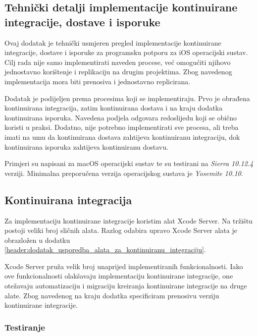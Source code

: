 \documentclass[times, utf8, diplomski, numeric]{fer}
\begin{document}
\begin{appendices}



\chapter{Tehnički detalji implementacije kontinuirane integracije, dostave i isporuke}

Ovaj dodatak je tehnički usmjeren pregled implementacije kontinuirane integracije, dostave i isporuke za programsku potporu za iOS operacijski sustav. Cilj rada nije samo implementirati naveden procese, već omogućiti njihovo jednostavno korištenje i replikaciju na drugim projektima. Zbog navedenog implementacija mora biti prenosiva i jednostavno replicirana.

Dodatak je podijeljen prema procesima koji se implementiraju. Prvo je obrađena kontinuirana integracija, zatim kontinuirana dostava i na kraju dodatka kontinuirana isporuka. Navedena podjela odgovara redoslijedu koji se obično koristi u praksi. Dodatno, nije potrebno implementirati sve procesa, ali treba imati na umu da kontinuirana dostava zahtijeva kontinuiranu integraciju, dok kontinuirana isporuka zahtijeva kontinuiranu dostavu.

Primjeri su napisani za macOS operacijski sustav te su testirani na \textit{Sierra 10.12.4} verziji. Minimalna preporučena verzija operacijskog sustava je \textit{Yosemite 10.10}.

\section{Kontinuirana integracija}

Za implementaciju kontinuirane integracije koristim alat Xcode Server. Na tržištu postoji veliki broj sličnih alata. Razlog odabira upravo Xcode Server alata je obrazložen u dodatku \ref{header:dodatak_usporedba_alata_za_kontinuiranu_integraciju}.

Xcode Server pruža velik broj unaprijed implementiranih funkcionalnosti. Iako ove funkcionalnosti olakšavaju implementaciju kontinuirane integracije, one otežavaju automatizaciju i migraciju kreiranja kontinuirane integracije na druge alate. Zbog navedenog na kraju dodatka specificiram prenosivu verziju kontinuirane integracije.





\subsection{Testiranje}


\end{appendices}
\end{document}
